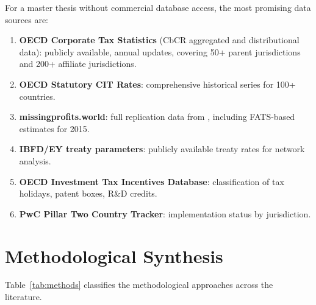 \documentclass[11pt,a4paper]{article}
\begin{document}
For a master thesis without commercial database access, the most promising data sources are:
\begin{enumerate}[nosep]
    \item \textbf{OECD Corporate Tax Statistics} (CbCR aggregated and distributional data): publicly available, annual updates, covering 50+ parent jurisdictions and 200+ affiliate jurisdictions.
    \item \textbf{OECD Statutory CIT Rates}: comprehensive historical series for 100+ countries.
    \item \textbf{missingprofits.world}: full replication data from \citet{torslov2022}, including FATS-based estimates for 2015.
    \item \textbf{IBFD/EY treaty parameters}: publicly available treaty rates for network analysis.
    \item \textbf{OECD Investment Tax Incentives Database}: classification of tax holidays, patent boxes, R\&D credits.
    \item \textbf{PwC Pillar Two Country Tracker}: implementation status by jurisdiction.
\end{enumerate}


\section{Methodological Synthesis}
\label{sec:methods}


Table~\ref{tab:methods} classifies the methodological approaches across the literature.
\end{document}
